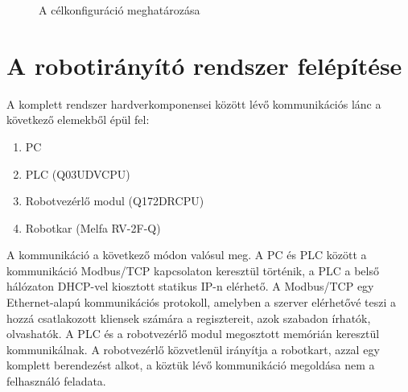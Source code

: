 \begin{figure}[H]
\centering     %
{}
\caption{A célkonfiguráció meghatározása}
\end{figure}

\section{A robotirányító rendszer felépítése}
	A komplett rendszer hardverkomponensei között lévő kommunikációs lánc a következő elemekből épül fel:
	
\begin{enumerate}
\item PC
\item PLC (Q03UDVCPU)
\item Robotvezérlő modul (Q172DRCPU)
\item Robotkar (Melfa RV-2F-Q)
\end{enumerate}	

	A kommunikáció a következő módon valósul meg. A PC és PLC között a kommunikáció Modbus/TCP kapcsolaton keresztül történik, a PLC a belső hálózaton DHCP-vel kiosztott statikus IP-n elérhető. A Modbus/TCP egy Ethernet-alapú kommunikációs protokoll, amelyben a szerver elérhetővé teszi a hozzá csatlakozott kliensek számára a regisztereit, azok szabadon írhatók, olvashatók. A PLC és a robotvezérlő modul megosztott memórián keresztül kommunikálnak. A robotvezérlő közvetlenül irányítja a robotkart, azzal egy komplett berendezést alkot, a köztük lévő kommunikáció megoldása nem a felhasználó feladata.
	
